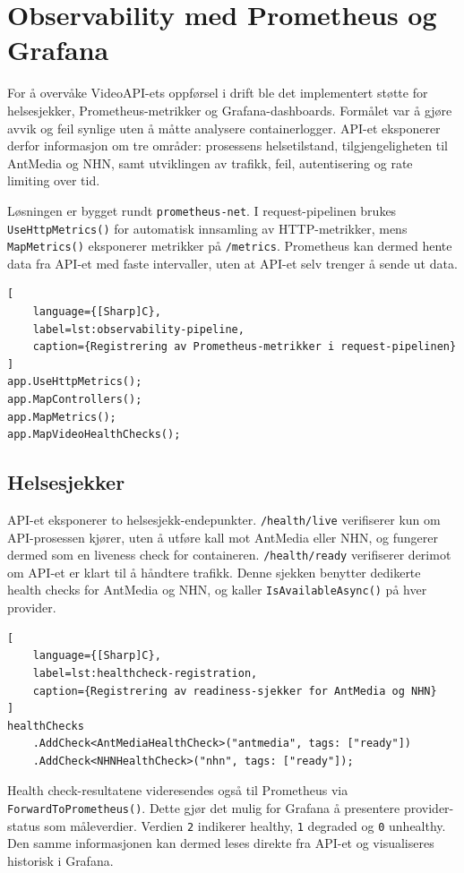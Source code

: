 \section{Observability med Prometheus og Grafana}

For å overvåke VideoAPI-ets oppførsel i drift ble det implementert støtte for helsesjekker, Prometheus-metrikker og Grafana-dashboards. Formålet var å gjøre avvik og feil synlige uten å måtte analysere containerlogger. API-et eksponerer derfor informasjon om tre områder: prosessens helsetilstand, tilgjengeligheten til AntMedia og NHN, samt utviklingen av trafikk, feil, autentisering og rate limiting over tid.

Løsningen er bygget rundt \texttt{prometheus-net}. I request-pipelinen brukes \texttt{UseHttpMetrics()} for automatisk innsamling av HTTP-metrikker, mens \texttt{MapMetrics()} eksponerer metrikker på \texttt{/metrics}. Prometheus kan dermed hente data fra API-et med faste intervaller, uten at API-et selv trenger å sende ut data.

\begin{lstlisting}[
    language={[Sharp]C},
    label=lst:observability-pipeline,
    caption={Registrering av Prometheus-metrikker i request-pipelinen}
]
app.UseHttpMetrics();
app.MapControllers();
app.MapMetrics();
app.MapVideoHealthChecks();
\end{lstlisting}

\subsection{Helsesjekker}

API-et eksponerer to helsesjekk-endepunkter. \texttt{/health/live} verifiserer kun om API-prosessen kjører, uten å utføre kall mot AntMedia eller NHN, og fungerer dermed som en liveness check for containeren. \texttt{/health/ready} verifiserer derimot om API-et er klart til å håndtere trafikk. Denne sjekken benytter dedikerte health checks for AntMedia og NHN, og kaller \texttt{IsAvailableAsync()} på hver provider.

\begin{lstlisting}[
    language={[Sharp]C},
    label=lst:healthcheck-registration,
    caption={Registrering av readiness-sjekker for AntMedia og NHN}
]
healthChecks
    .AddCheck<AntMediaHealthCheck>("antmedia", tags: ["ready"])
    .AddCheck<NHNHealthCheck>("nhn", tags: ["ready"]);
\end{lstlisting}

Health check-resultatene videresendes også til Prometheus via \texttt{ForwardToPrometheus()}. Dette gjør det mulig for Grafana å presentere provider-status som måleverdier. Verdien \texttt{2} indikerer healthy, \texttt{1} degraded og \texttt{0} unhealthy. Den samme informasjonen kan dermed leses direkte fra API-et og visualiseres historisk i Grafana.

